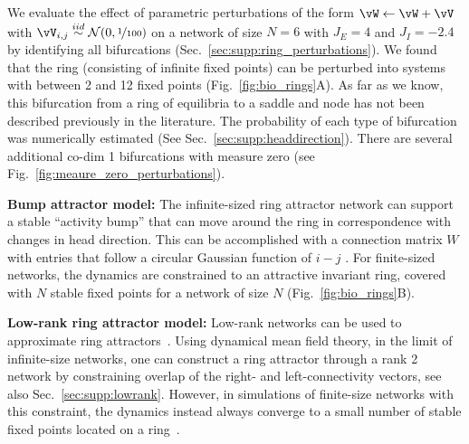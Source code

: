\documentclass{article} %
\newcommand{\ptitle}[1]{\textbf{#1:}\xspace}
\newcommand{\mpcomment}[1]{\textcolor{mpcolor}{(#1)}}
\newcounter{ct}
\newcommand{\iidsample}{\stackrel{iid}{\sim}}
\theoremstyle{definition}
\theoremstyle{remark}
\begin{document}
We evaluate the effect of parametric perturbations of the form \( \vW \leftarrow \vW + \vV\) with \(\vV_{i,j}\iidsample\mathcal{N}(0,\nicefrac{1}{100})\) on a network of size \(N = 6\) with \(J_E= 4\) and \(J_I=-2.4\) by identifying all bifurcations (Sec.~\ref{sec:supp:ring_perturbations}).
We found that the ring (consisting of infinite fixed points) can be perturbed into systems with between 2 and 12 fixed points (Fig.~\ref{fig:bio_rings}A).
As far as we know, this bifurcation from a ring of equilibria to a saddle and node has not been described previously in the literature.
The probability of each type of bifurcation was numerically estimated (See Sec.~\ref{sec:supp:headdirection}).
There are several additional co-dim 1 bifurcations with measure zero (see Fig.~\ref{fig:meaure_zero_perturbations}).


\ptitle{Bump attractor model}
The infinite-sized ring attractor network can support a stable ``activity bump'' that can move around the ring in correspondence with changes in head direction.
This can be accomplished with a connection matrix \(W\) with entries that follow a circular Gaussian function of \(i-j\) \citep{seeholzer2017efficient,redish1996coupled,goodridge2000,compte2000synaptic}.
For finite-sized networks, the dynamics are constrained to an attractive invariant ring, covered with \(N\) stable fixed points for a network of size \(N\) (Fig.~\ref{fig:bio_rings}B).
%

\ptitle{Low-rank ring attractor model} %
Low-rank networks can be used to approximate ring attractors~\citep{mastrogiuseppe2018, beiran2021}.
Using dynamical mean field theory, in the limit of infinite-size networks, one can construct a ring attractor through a rank 2 network by constraining overlap of the right- and left-connectivity vectors, see also Sec.~\ref{sec:supp:lowrank}.
However, in simulations of finite-size networks with this constraint, the dynamics instead always converge to a small number of stable fixed points located on a ring~\citep{mastrogiuseppe2018}.
\end{document}
